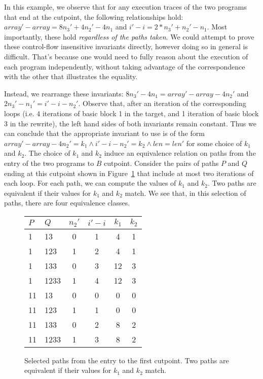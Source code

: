 In this example, we observe that for any execution traces of the two
programs that end at the cutpoint, the following relationships hold:
$array' - array = 8n_3' + 4n_2' - 4n_1$ and $i' - i = 2*n_3' + n_2'
- n_1$. Most importantly, these hold \emph{regardless of the paths
taken}. We could attempt to prove these control-flow insensitive
invariants directly, however doing so in general is difficult. That's
because one would need to fully reason about the execution of each
program independently, without taking advantage of the correspondence
with the other that illustrates the equality.

Instead, we rearrange these invariants: $8n_3' - 4n_1 = array' - array
- 4n_2'$ and $2n_3' - n_1' = i' - i - n_2'$. Observe that, after an
iteration of the corresponding loops (i.e. 4 iterations of basic block
1 in the target, and 1 iteration of basic block 3 in the rewrite),
the left hand sides of both invariants remain constant. Thus we can
conclude that the appropriate invariant to use is of the form $array'
- array - 4n_2' = k_1 \wedge i' - i - n_2' = k_2 \wedge len = len'$
for some choice of $k_1$ and $k_2$. The choice of $k_1$ and $k_2$
induce an equivalence relation on paths from the entry of the two
programs to $B$ cutpoint. Consider the pairs of paths $P$ and $Q$
ending at this cutpoint shown in Figure~\ref{fig:egpaths} that include
at most two iterations of each loop. For each path, we can compute the
values of $k_1$ and $k_2$. Two paths are equivalent if their values
for $k_1$ and $k_2$ match. We see that, in this selection of paths,
there are four equivalence classes.

\begin{figure}
\begin{tabular}{|ll|cccc|}
\hline
$P$       & $Q$ & $n_2'$ & $i'-i$ & $k_1$ & $k_2$ \\ \hline  \hline
1  & 13      &  0 & 1  & 4 & 1  \\
1  & 123     &  1 & 2  & 4 & 1  \\
1  & 133     &  0 & 3  & 12 & 3  \\
1  & 1233    &  1 & 4  & 12 & 3  \\
11 & 13      &  0 & 0  & 0 & 0  \\
11 & 123     &  1 & 1  & 0 & 0  \\
11 & 133     &  0 & 2  & 8 & 2  \\
11 & 1233    &  1 & 3  & 8 & 2  \\ \hline
\end{tabular}
\caption{Selected paths from the entry to the first cutpoint. Two
paths are equivalent if their values for $k_1$ and $k_2$ match.}
\label{fig:egpaths}
\end{figure}

